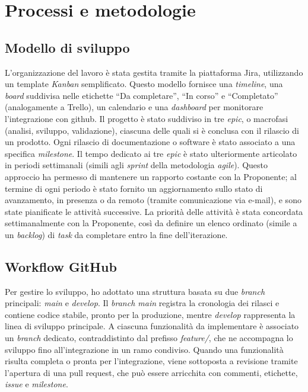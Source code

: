 \chapter{Processi e metodologie}
\label{cap:processi-metodologie}

\section{Modello di sviluppo}

L’organizzazione del lavoro è stata gestita tramite la piattaforma Jira, utilizzando un template \textit{Kanban} semplificato. Questo modello fornisce una \textit{timeline}, una \textit{board} suddivisa nelle etichette “Da completare”, “In corso” e “Completato” (analogamente a Trello), un calendario e una \textit{dashboard} per monitorare l’integrazione con \gls{github}. Il progetto è stato suddiviso in tre \textit{epic}, o macrofasi (analisi, sviluppo, validazione), ciascuna delle quali si è conclusa con il rilascio di un prodotto. Ogni rilascio di documentazione o software è stato associato a una specifica \textit{milestone}. Il tempo dedicato ai tre \textit{epic} è stato ulteriormente articolato in periodi settimanali (simili agli \textit{sprint} della metodologia \textit{agile}). Questo approccio ha permesso di mantenere un rapporto costante con la Proponente; al termine di ogni periodo è stato fornito un aggiornamento sullo stato di avanzamento, in presenza o da remoto (tramite comunicazione via e-mail), e sono state pianificate le attività successive. La priorità delle attività è stata concordata settimanalmente con la Proponente, così da definire un elenco ordinato (simile a un \textit{backlog}) di \textit{task} da completare entro la fine dell’iterazione.

\section{Workflow GitHub}

Per gestire lo sviluppo, ho adottato una struttura basata su due \textit{branch} principali: \textit{main} e \textit{develop}. Il \textit{branch main} registra la cronologia dei rilasci e contiene codice stabile, pronto per la produzione, mentre \textit{develop} rappresenta la linea di sviluppo principale. A ciascuna funzionalità da implementare è associato un \textit{branch} dedicato, contraddistinto dal prefisso \textit{feature/}, che ne accompagna lo sviluppo fino all’integrazione in un ramo condiviso. Quando una funzionalità risulta completa o pronta per l’integrazione, viene sottoposta a revisione tramite l’apertura di una \gls{pull request}, che può essere arricchita con commenti, etichette, \textit{issue} e \textit{milestone}.

